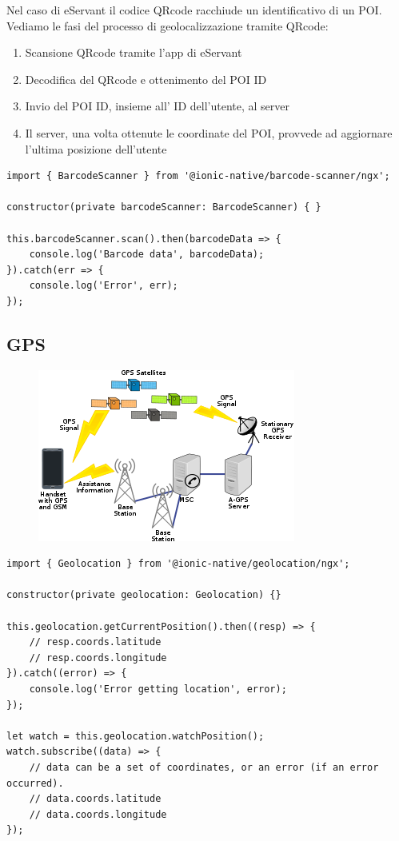 Nel caso di eServant il codice QRcode racchiude un identificativo di un POI. \\
Vediamo le fasi del processo di geolocalizzazione tramite QRcode:

\begin{enumerate}
    \item Scansione QRcode tramite l'app di eServant
    \item Decodifica del QRcode e ottenimento del POI ID
    \item Invio del POI ID, insieme all' ID dell'utente, al server
    \item Il server, una volta ottenute le coordinate del POI, provvede ad aggiornare l'ultima posizione dell'utente
\end{enumerate}

\begin{lstlisting}
import { BarcodeScanner } from '@ionic-native/barcode-scanner/ngx';

constructor(private barcodeScanner: BarcodeScanner) { }

this.barcodeScanner.scan().then(barcodeData => {
    console.log('Barcode data', barcodeData);
}).catch(err => {
    console.log('Error', err);
});
\end{lstlisting}

\subsection{GPS}

\begin{figure}[H]
    \centering  
    \includegraphics[scale=0.6]{img/cap2/gps}
\end{figure}

\begin{lstlisting}
import { Geolocation } from '@ionic-native/geolocation/ngx';

constructor(private geolocation: Geolocation) {}

this.geolocation.getCurrentPosition().then((resp) => {
    // resp.coords.latitude
    // resp.coords.longitude
}).catch((error) => {
    console.log('Error getting location', error);
});

let watch = this.geolocation.watchPosition();
watch.subscribe((data) => {
    // data can be a set of coordinates, or an error (if an error occurred).
    // data.coords.latitude
    // data.coords.longitude
});
\end{lstlisting}

